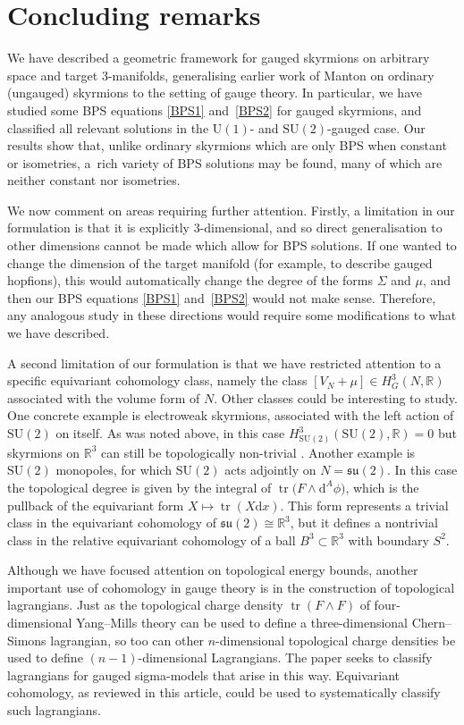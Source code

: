 \documentclass[pdftex]{sigma}
\newcommand{\su}{{\mathfrak{su}}}
\newcommand{\SU}{{\mathrm{SU}}}
\newcommand{\U}{{\mathrm{U}}}
\newcommand{\R}{{\mathbb{R}}}
\newcommand{\1}{{\mathbb{1}}}
\def \d{\mathrm{d}}
\newcommand{\tr}{{\operatorname{tr}}}
\numberwithin{equation}{section}
\begin{document}
\section{Concluding remarks}
We have described a geometric framework for gauged skyrmions on arbitrary space and target $3$-manifolds, generalising earlier work of Manton \cite{Manton1987geometry} on ordinary (ungauged) skyrmions to the setting of gauge theory. In particular, we have studied some BPS equations \eqref{BPS1} and~\eqref{BPS2} for gauged skyrmions, and classified all relevant solutions in the $\U(1)$- and $\SU(2)$-gauged case. Our results show that, unlike ordinary skyrmions which are only BPS when constant or isometries, a~rich variety of BPS solutions may be found, many of which are neither constant nor isometries.

We now comment on areas requiring further attention. Firstly, a limitation in our formulation is that it is explicitly $3$-dimensional, and so direct generalisation to other dimensions cannot be made which allow for BPS solutions. If one wanted to change the dimension of the target manifold (for example, to describe gauged hopfions), this would automatically change the degree of the forms $\Sigma$ and $\mu$, and then our BPS equations \eqref{BPS1} and~\eqref{BPS2} would not make sense. Therefore, any analogous study in these directions would require some modifications to what we have described.

A second limitation of our formulation is that we have restricted attention to a specific equivariant cohomology class, namely the class $[V_N+\mu]\in H^3_G(N,\R)$ associated with the volume form of $N$. Other classes could be interesting to study. One concrete example is electroweak skyrmions, associated with the left action of $\SU(2)$ on itself. As was noted above, in this case $H^3_{\SU(2)}(\SU(2),\R)=0$ but skyrmions on $\R^3$ can still be topologically non-trivial \cite{criadoKhozeSpannowsky2021emergence,dHokerFarhi1984decoupling}. Another example is $\SU(2)$ monopoles, for which $\SU(2)$ acts adjointly on $N=\su(2)$. In this case the topological degree is given by the integral of $\tr\big(F\wedge \d^A\phi\big)$, which is the pullback of the equivariant form $X\mapsto \tr(X\d x)$. This form represents a trivial class in the equivariant cohomology of $\su(2)\cong\R^3$, but it defines a nontrivial class in the relative equivariant cohomology of a ball $B^3\subset\R^3$ with boundary $S^2$.

Although we have focused attention on topological energy bounds, another important use of cohomology in gauge theory is in the construction of topological lagrangians. Just as the topological charge density $\tr(F\wedge F)$ of four-dimensional Yang--Mills theory can be used to define a three-dimensional Chern--Simons lagrangian, so too can other $n$-dimensional topological charge densities be used to define $(n-1)$-dimensional Lagrangians. The paper \cite{tchrakian2022SkyChernSimons} seeks to classify lagrangians for gauged sigma-models that arise in this way. Equivariant cohomology, as reviewed in this article, could be used to systematically classify such lagrangians.
\end{document}
